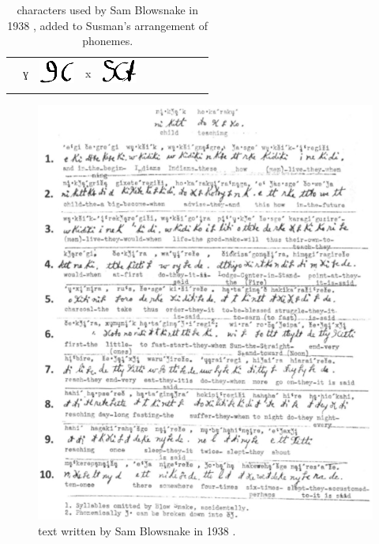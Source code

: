 \documentclass[output=paper]{LSP/langsci}
\begin{document}
\begin{table}
\begin{tabular}{lllllllllll}
& ɣ & \includegraphics{figures/Danker4gh} & x & \includegraphics{figures/Danker4x}\\
\lspbottomrule
\end{tabular}
\caption{  characters used by Sam Blowsnake in 1938 \citep{Susman1939}, added to Susman's \citeyearpar[15]{Susman1943} arrangement of  phonemes.}
\label{blowsnakesyllabary}
\end{table}

\begin{figure}
\includegraphics[width=1\textwidth]{figures/DankerBlowsnakeText}
\caption{  text written by Sam Blowsnake in 1938 \citep{Susman1939}.}
\label{blowsnaketext}
\end{figure}
\end{document}
